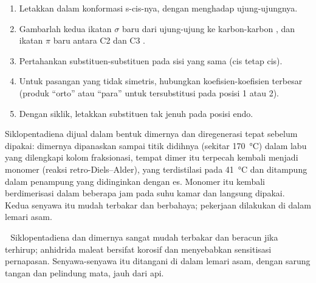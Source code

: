 \begin{method}\label{met:b2:frontier-orbitals:diels-alder}
\begin{enumerate}
  \item Letakkan  dalam konformasi s-cis-nya, dengan 
        menghadap ujung-ujungnya.
  \item Gambarlah kedua ikatan $\sigma$ baru dari ujung-ujung  ke
        karbon-karbon , dan ikatan $\pi$ baru antara C2 dan C3 .
  \item Pertahankan substituen-substituen  pada sisi yang sama (cis
        tetap cis).
  \item Untuk pasangan yang tidak simetris, hubungkan koefisien-koefisien
        terbesar (produk ``orto'' atau ``para'' untuk  tersubstitusi
        pada posisi 1 atau 2).
  \item Dengan  siklik, letakkan substituen tak jenuh pada posisi
        endo.
\end{enumerate}
\end{method}

\begin{inthelab}
Siklopentadiena dijual dalam bentuk dimernya dan diregenerasi tepat sebelum
dipakai: dimernya dipanaskan sampai titik didihnya (sekitar
\qty{170}{\degreeCelsius}) dalam labu yang dilengkapi kolom fraksionasi,
tempat dimer itu terpecah kembali menjadi monomer (reaksi retro-Diels--Alder),
yang terdistilasi pada \qty{41}{\degreeCelsius} dan ditampung dalam
penampung yang didinginkan dengan es. Monomer itu kembali berdimerisasi
dalam beberapa jam pada suhu kamar dan langsung dipakai. Kedua senyawa itu
mudah terbakar dan berbahaya; pekerjaan dilakukan di dalam lemari asam.
\end{inthelab}

\begin{safety}{\,\,}
Siklopentadiena dan dimernya sangat mudah terbakar dan beracun jika
terhirup; anhidrida maleat bersifat korosif dan menyebabkan sensitisasi
pernapasan. Senyawa-senyawa itu ditangani di dalam lemari asam, dengan
sarung tangan dan pelindung mata, jauh dari api.
\end{safety}

